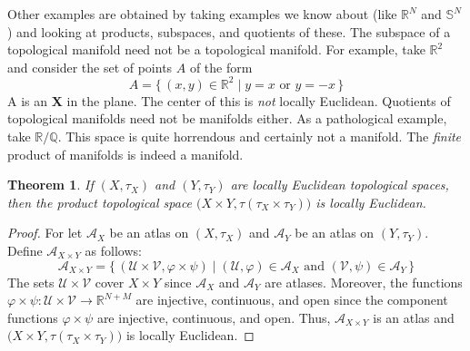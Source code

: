 \documentclass{article}
\theoremstyle{plain}
\newtheorem{theorem}{Theorem}[section]
\theoremstyle{normal}
\begin{document}
        \par\hfill\par
        Other examples are obtained by taking examples we know about
        (like $\mathbb{R}^{N}$ and $\mathbb{S}^{N}$) and looking at products,
        subspaces, and quotients of these. The subspace of a topological
        manifold need not be a topological manifold. For example, take
        $\mathbb{R}^{2}$ and consider the set of points $A$ of the form
        \begin{equation}
            A=\{\,(x,y)\in\mathbb{R}^{2}\;|\;y=x\textrm{ or }y=-x\,\}
        \end{equation}
        A is an \textbf{X} in the plane. The center of this is \textit{not}
        locally Euclidean. Quotients of topological manifolds need not be
        manifolds either. As a pathological example, take
        $\mathbb{R}/\mathbb{Q}$. This space is quite horrendous and certainly
        not a manifold. The \textit{finite} product of manifolds is indeed a
        manifold.
        \begin{theorem}
            If $(X,\tau_{X})$ and $(Y,\tau_{Y})$ are locally Euclidean
            topological spaces, then the product topological space
            $\big(X\times{Y},\tau(\tau_{X}\times\tau_{Y})\big)$ is locally
            Euclidean.
        \end{theorem}
        \begin{proof}
            For let $\mathcal{A}_{X}$ be an atlas on $(X,\tau_{X})$ and
            $\mathcal{A}_{Y}$ be an atlas on $(Y,\tau_{Y})$. Define
            $\mathcal{A}_{X\times{Y}}$ as follows:
            \begin{equation}
                \mathcal{A}_{X\times{Y}}=
                \{\,(\mathcal{U}\times\mathcal{V},\varphi\times\psi)\;|\;
                    (\mathcal{U},\varphi)\in\mathcal{A}_{X}\textrm{ and }
                    (\mathcal{V},\psi)\in\mathcal{A}_{Y}\,\}
            \end{equation}
            The sets $\mathcal{U}\times\mathcal{V}$ cover $X\times{Y}$ since
            $\mathcal{A}_{X}$ and $\mathcal{A}_{Y}$ are atlases. Moreover,
            the functions
            $\varphi\times\psi:\mathcal{U}\times\mathcal{V}\rightarrow\mathbb{R}^{N+M}$
            are injective, continuous, and open since the component functions
            $\varphi\times\psi$ are injective, continuous, and open.
            Thus, $\mathcal{A}_{X\times{Y}}$ is an atlas and
            $\big(X\times{Y},\tau(\tau_{X}\times\tau_{Y})\big)$ is locally
            Euclidean.
        \end{proof}
\end{document}

